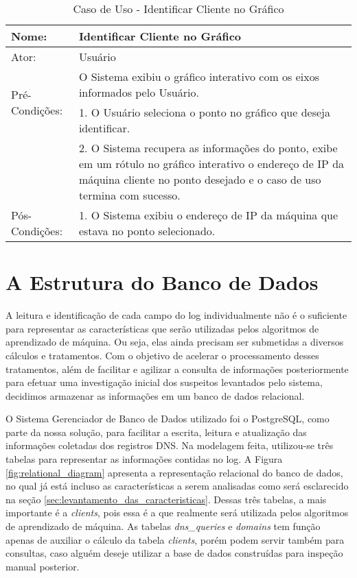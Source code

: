 \begin{table}[]
\centering
\caption{Caso de Uso - Identificar Cliente no Gráfico}
\label{tab:use_case_identify}
\begin{tabular}{|lp{10cm}|}
\hline
Nome: & Identificar Cliente no Gráfico  \\ \hline
Ator: & Usuário   \\ \hline
\multirow{2}{*}{Pré-Condições:} & O Sistema exibiu o gráfico interativo com os eixos informados pelo Usuário.  \\ \hline
\multirow{6}{*}{Fluxo Básico de Eventos:} & 1. O Usuário seleciona o ponto no gráfico que deseja identificar.  \\
 & 2. O Sistema recupera as informações do ponto, exibe em um rótulo no gráfico interativo o endereço de IP da máquina cliente no ponto desejado e o caso de uso termina com sucesso. \\
 \hline
 \multirow{2}{*}{Pós-Condições:} & 1. O Sistema exibiu o endereço de IP da máquina que estava no ponto selecionado. \\
 \hline
\end{tabular}
\end{table}

\section{A Estrutura do Banco de Dados} \label{sec:database_structure}
A leitura e identificação de cada campo do log individualmente não é o suficiente para representar as características que serão utilizadas pelos algoritmos de aprendizado de máquina. Ou seja, elas ainda precisam ser submetidas a diversos cálculos e tratamentos. Com o objetivo de acelerar o processamento desses tratamentos, além de facilitar e agilizar a consulta de informações posteriormente para efetuar uma investigação inicial dos suspeitos levantados pelo sistema, decidimos armazenar as informações em um banco de dados relacional.

O Sistema Gerenciador de Banco de Dados utilizado foi o PostgreSQL, como parte da nossa solução, para facilitar a escrita, leitura e atualização das informações coletadas dos registros DNS. Na modelagem feita, utilizou-se três tabelas para representar as informações contidas no log. A Figura \ref{fig:relational_diagram} apresenta a representação relacional do banco de dados, no qual já está incluso as características a serem analisadas como será esclarecido na seção \ref{sec:levantamento_das_caracteristicas}. Dessas três tabelas, a mais importante é a \textit{clients}, pois essa é a que realmente será utilizada pelos algoritmos de aprendizado de máquina. As tabelas \textit{dns\_queries} e \textit{domains} tem função apenas de auxiliar o cálculo da tabela \textit{clients}, porém podem servir também para consultas, caso alguém deseje utilizar a base de dados construídas para inspeção manual posterior.

